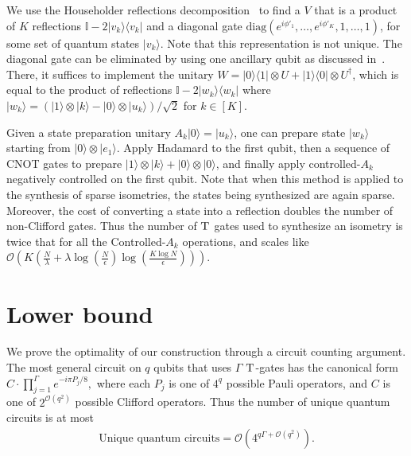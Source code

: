 \documentclass[a4paper,onecolumn,10pt,accepted=2024-05-22]{quantumarticle}
\newcommand{\ket}[1]{| #1\rangle}        %
\newcommand{\ketbra}[2]{| #1 \rangle\!\langle #2 |} %
\newcommand{\ii}{\mathbb{I}}		%
\begin{document}
	We use the Householder reflections decomposition~\cite{Householder1958} to find a $V$ that is a product of $K$ reflections 
	$\ii - 2\ketbra{v_k}{v_k}$ and a diagonal gate $\mathrm{diag}(e^{i\phi'_1}, \ldots, e^{i \phi'_K}, 1, \ldots, 1)$, for some set of quantum states $\ket{v_k}$. Note that this representation is not unique. The diagonal gate can be eliminated by using one ancillary qubit as discussed in~\cite{Kliuchnikov2013Reflections}. There, it suffices to implement the unitary 
	$W = \ketbra{0}{1}\otimes U + \ketbra{1}{0}\otimes U^\dagger$, which is equal to the product of reflections
	$\ii - 2\ketbra{w_k}{w_k}$ where $\ket{w_k} = (\ket{1}\otimes\ket{k} - \ket{0}\otimes\ket{u_k})/\sqrt{2}$ for $k\in[K]$. 
	
	Given a state preparation unitary $A_k\ket{0}=\ket{u_k}$, one can prepare state $\ket{w_k}$ starting from $\ket{0}\otimes \ket{e_1}$. Apply Hadamard to the first qubit, then a sequence of CNOT gates to prepare $\ket{1}\otimes\ket{k}+\ket{0}\otimes\ket{0}$, and finally apply controlled-$A_k$ negatively controlled on the first qubit. Note that when this method is applied to the synthesis of sparse isometries, the states being synthesized are again sparse.  Moreover, the cost of converting a state into a reflection doubles the number of non-Clifford gates.
	Thus the number of $\textsc{T}$ gates used to synthesize an isometry is twice that for all the Controlled-$A_k$ operations, and scales like $\mathcal{O}\left(K\left(\frac{N}{\lambda}+\lambda \log{(\frac{N}{\epsilon})}\log{(\frac{K\log{N}}{\epsilon})}\right)\right)$. 
	
	\section{Lower bound}
	We prove the optimality of our construction through a circuit counting argument. The most general circuit on $q$ qubits that uses $\Gamma$ $\textsc{T}$-gates has the canonical form~\cite{Gosset2014}
	$%
	C\cdot\prod^\Gamma_{j=1}e^{-i\pi P_j/8},
	$%
	where each $P_j$ is one of $4^q$ possible Pauli operators, and $C$ is one of $2^{\mathcal{O}(q^2)}$ possible Clifford operators. Thus the number of unique quantum circuits is at most 
	\begin{align}
	\label{eq:unique_circuits}
	\text{Unique quantum circuits} = \mathcal{O}( 4^{q \Gamma+\mathcal{O}(q^2)}).
	\end{align} 
	
\end{document}
